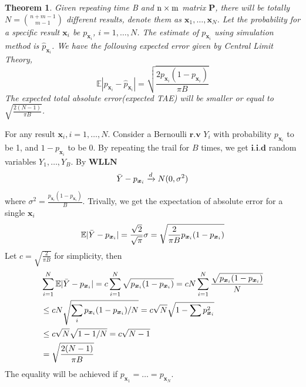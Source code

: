 \documentclass[12pt]{article}
\newcommand{\EE}{\mathbb{E}}
\newcommand{\Pmat}{\mathbf{P}}
\newcommand{\wh}{\widehat}
\newtheorem{thm}{Theorem}
\begin{document}
\begin{thm}
Given repeating time \mbox{B} and $\rm n \times m$ matrix $\Pmat$, there will be totally  $N=\binom{n+m-1}{m-1}$ different results, denote them as  $\boldsymbol{x}_1,\dots,\boldsymbol{x}_N$. Let the probability for a specific result $\boldsymbol{x}_{i}$ be $p_{\boldsymbol{x}_{i}}$, $i=1,\dots,N$. The estimate of  $p_{\boldsymbol{x}_{i}}$ using simulation method is $\wh{p}_{\boldsymbol{x}_i}$. We have the following expected error given by Central Limit Theory,
\begin{equation*}
    \EE|p_{\boldsymbol{x}_i} - \wh{p}_{\boldsymbol{x}_i}| =  \sqrt{\frac{2 p_{\boldsymbol{x}_i}(1-p_{\boldsymbol{x}_i})}{\pi B}}
\end{equation*}
The expected total absolute error(expected \mbox{TAE}) will be smaller or equal to
$\sqrt{\frac{2(N-1)}{\pi B}}$.
\end{thm}
For any result $\boldsymbol{x}_i,i=1,\dots,N$. Consider a Bernoulli $\textbf{r.v}$ $Y_i$ with probability $p_{\boldsymbol{x}_i}$ to be 1, and $1-p_{\boldsymbol{x}_i}$ to be 0. By repeating the trail for $B$ times, we get $\textbf{i.i.d}$ random variables $Y_1,\dots,Y_{B}$. By $\textbf{WLLN}$
\begin{equation*}
    \Bar{Y}-p_{\boldsymbol{x}_i} \xrightarrow{d} N(0,\sigma^2)
\end{equation*}
where $\sigma^2 = \frac{p_{\boldsymbol{x}_i}(1-p_{\boldsymbol{x}_i})}{B}$. Trivally, we get the expectation of absolute error for a single $\boldsymbol{x}_i$
\begin{equation*}
    \EE |\Bar{Y}-p_{\boldsymbol{x}_i}| = \frac{\sqrt{2}}{\sqrt{\pi}}\sigma = \sqrt{\frac{2}{\pi B}p_{\boldsymbol{x}_i}(1-p_{\boldsymbol{x}_i})}
\end{equation*}
Let $c = \sqrt{\frac{2}{\pi B}}$ for simplicity, then
\begin{align*}
    & \sum_{i=1}^{N}\EE |\Bar{Y}-p_{\boldsymbol{x}_i}| = c \sum_{i=1}^{N} \sqrt{p_{\boldsymbol{x}_i}(1-p_{\boldsymbol{x}_i})}  = c N \sum_{i=1}^{N}\frac{\sqrt{p_{\boldsymbol{x}_i}(1-p_{\boldsymbol{x}_i})}}{N} \\
    & \leq c N \sqrt{\sum_{i}p_{\boldsymbol{x}_i}(1-p_{\boldsymbol{x}_i})/N} = c \sqrt{N} \sqrt{1-\sum p_{\boldsymbol{x}_{i}}^2}\\ &\leq c \sqrt{N} \sqrt{1-1/N} = c\sqrt{N-1}\\
    & = \sqrt{\frac{2(N-1)}{\pi B}}
\end{align*}
The equality will be achieved if $p_{\boldsymbol{x}_1} = \dots = p_{\boldsymbol{x}_N}$.
\end{document}
